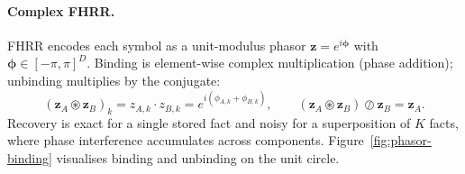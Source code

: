 \documentclass[11pt]{article}
\theoremstyle{definition}
\newcommand{\bind}{\circledast}
\newcommand{\unbind}{\oslash}
\begin{document}
\paragraph{Complex FHRR.}
FHRR encodes each symbol as a unit-modulus phasor $\mathbf{z} = e^{i\boldsymbol{\phi}}$
with $\boldsymbol{\phi} \in [-\pi, \pi]^D$. Binding is element-wise complex
multiplication (phase addition); unbinding multiplies by the conjugate:
\begin{equation}
  (\mathbf{z}_A \bind \mathbf{z}_B)_k = z_{A,k} \cdot z_{B,k} = e^{i(\phi_{A,k}+\phi_{B,k})},
  \qquad
  (\mathbf{z}_A \bind \mathbf{z}_B) \unbind \mathbf{z}_B = \mathbf{z}_A.
  \label{eq:fhrr-bind}
\end{equation}
Recovery is exact for a single stored fact and noisy for a superposition of $K$
facts, where phase interference accumulates across components.
Figure~\ref{fig:phasor-binding} visualises binding and unbinding on the unit circle.
\end{document}
